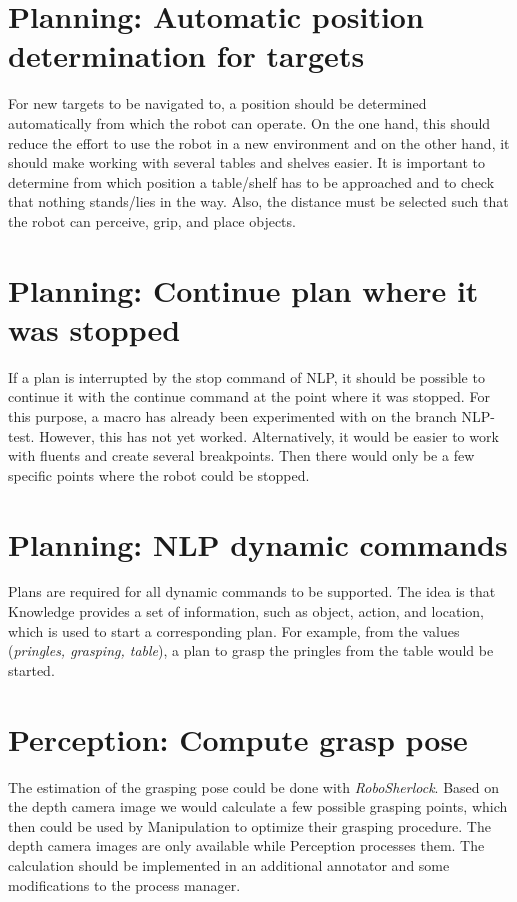 \documentclass[main.tex]{subfiles}
\begin{document}
		\section{Planning: Automatic position determination for targets}
		For new targets to be navigated to, a position should be determined automatically from which the robot can operate. On the one hand, this should reduce the effort to use the robot in a new environment and on the other hand, it should make working with several tables and shelves easier. It is important to determine from which position a table/shelf has to be approached and to check that nothing stands/lies in the way. Also, the distance must be selected such that the robot can perceive, grip, and place objects.	
		
		\section{Planning: Continue plan where it was stopped}
		If a plan is interrupted by the stop command of NLP, it should be possible to continue it with the continue command at the point where it was stopped. For this purpose, a macro has already been experimented with on the branch NLP-test. However, this has not yet worked. Alternatively, it would be easier to work with fluents and create several breakpoints. Then there would only be a few specific points where the robot could be stopped.
		
		\section{Planning: NLP dynamic commands}
		Plans are required for all dynamic commands to be supported. The idea is that Knowledge provides a set of information, such as object, action, and location, which is used to start a corresponding plan. For example, from the values (\textit{pringles, grasping, table}), a plan to grasp the pringles from the table would be started.
		
		\section{Perception: Compute grasp pose}
		The estimation of the grasping pose could be done with \textit{RoboSherlock}. Based on the depth camera image we would calculate a few possible grasping points, which then could be used by Manipulation to optimize their grasping procedure. The depth camera images are only available while Perception processes them. The calculation should be implemented in an additional annotator and some modifications to the process manager.
		
\end{document}
